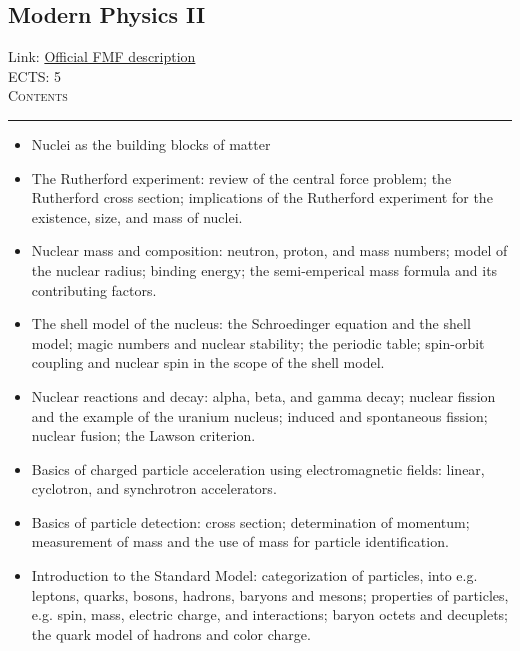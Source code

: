 \documentclass[11pt, a4paper]{article}
\newenvironment{course}[3]{
\subsection{#1}%
Link: \href{#2}{Official FMF description}\\%
ECTS: #3%
\vspace{1ex}
\\
{\large \textsc{Contents}}\\[-0.9ex]%
\rule{\textwidth}{0.5pt}
\vspace{-3ex}
}
{}
\newenvironment{chapter}[1]{
\begin{tcolorbox}[title=#1, breakable]
}
{\end{tcolorbox}}
\begin{document}
\begin{course}{Modern Physics II}{https://www.fmf.uni-lj.si/en/study-physics/programmes/1fiz/2020/7000777/courses/1162/}{5}
\begin{chapter}{Introduction to solid state physics}
    \end{chapter}

    \begin{chapter}{Introduction to nuclear physics}
        \begin{itemize}
        
            \item Nuclei as the building blocks of matter

            \item The Rutherford experiment: review of the central force problem; the Rutherford cross section; implications of the Rutherford experiment for the existence, size, and mass of nuclei.

            \item Nuclear mass and composition: neutron, proton, and mass numbers; model of the nuclear radius; binding energy; the semi-emperical mass formula and its contributing factors.

            \item The shell model of the nucleus: the Schroedinger equation and the shell model; magic numbers and nuclear stability; the periodic table; spin-orbit coupling and nuclear spin in the scope of the shell model.

            \item Nuclear reactions and decay: alpha, beta, and gamma decay; nuclear fission and the example of the uranium nucleus; induced and spontaneous fission; nuclear fusion; the Lawson criterion.
        
        \end{itemize}
    \end{chapter}

    \begin{chapter}{Introduction to particle physics}
        \begin{itemize}
        
            \item Basics of charged particle acceleration using electromagnetic fields: linear, cyclotron, and synchrotron accelerators.

            \item Basics of particle detection: cross section; determination of momentum; measurement of mass and the use of mass for particle identification.

            \item Introduction to the Standard Model: categorization of particles, into e.g. leptons, quarks, bosons, hadrons, baryons and mesons; properties of particles, e.g. spin, mass, electric charge, and interactions; baryon octets and decuplets; the quark model of hadrons and color charge.


\end{itemize}
\end{chapter}
\end{course}
\end{document}

